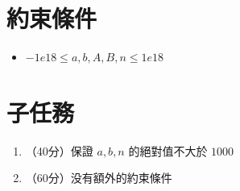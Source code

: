 \documentclass[18pt]{article}
\begin{document}
    \section*{約束條件}
    \begin{itemize}
        \item $-1e18 \le a,b,A,B,n \le 1e18$
    \end{itemize}
    \section*{子任務}
    \begin{enumerate}
        \item （40分）保證 $a,b,n$ 的絕對值不大於 $1000$
        \item （60分）没有額外的約束條件
    \end{enumerate}
\end{document}
